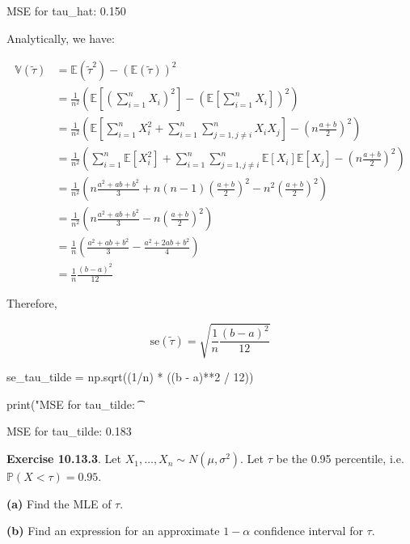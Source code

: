 \begin{console}
MSE for tau\_hat:         0.150
\end{console}

Analytically, we have:

\begin{align}
\mathbb{V}(\tilde{\tau}) 
&= \mathbb{E}(\tilde{\tau}^2) - (\mathbb{E}(\tilde{\tau}))^2 \\
&= \frac{1}{n^2}\left(\mathbb{E}\left[ \left(\sum_{i=1}^n X_i\right)^2\right] - \left(\mathbb{E}\left[\sum_{i=1}^n X_i \right]\right)^2\right) \\
&= \frac{1}{n^2}\left( \mathbb{E}\left[ \sum_{i=1}^n X_i^2 + \sum_{i=1}^n \sum_{j=1, j \neq i}^n X_i X_j \right] - \left(n \frac{a + b}{2}\right)^2\right) \\
&= \frac{1}{n^2}\left( \sum_{i=1}^n \mathbb{E}[X_i^2] + \sum_{i=1}^n \sum_{j=1, j \neq i}^n \mathbb{E}[X_i]\mathbb{E}[X_j]  - \left(n \frac{a + b}{2}\right)^2\right) \\
&= \frac{1}{n^2}\left( n \frac{a^2 + ab + b^2}{3} + n(n-1) \left(\frac{a+b}{2}\right)^2  - n^2\left(\frac{a + b}{2}\right)^2\right) \\
&= \frac{1}{n^2}\left( n \frac{a^2 + ab + b^2}{3} - n \left(\frac{a+b}{2}\right)^2 \right) \\
&= \frac{1}{n} \left( \frac{a^2 + ab + b^2}{3} - \frac{a^2 + 2ab + b^2}{4}\right) \\
&= \frac{1}{n} \frac{(b - a)^2}{12}
\end{align}

Therefore,

\[\text{se}(\tilde{\tau}) = \sqrt{\frac{1}{n} \frac{(b - a)^2}{12}}\]

\begin{python}
se_tau_tilde = np.sqrt((1/n) * ((b - a)**2 / 12))

print("MSE for tau_tilde: \t %
\end{python}

\begin{console}
MSE for tau\_tilde:       0.183
\end{console}

\textbf{Exercise 10.13.3}. Let
\(X_1, \dots, X_n \sim N(\mu, \sigma^2)\). Let \(\tau\) be the 0.95
percentile, i.e.~\(\mathbb{P}(X < \tau) = 0.95\).

\textbf{(a)} Find the MLE of \(\tau\).

\textbf{(b)} Find an expression for an approximate \(1 - \alpha\)
confidence interval for \(\tau\).

